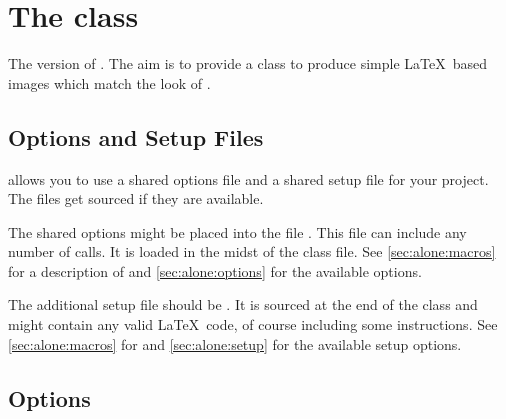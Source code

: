 \chapter{The  class}
The  version of . The aim is to provide a class
to produce simple \LaTeX\ based images which match the look of .

\section{Options and Setup Files}\label{sec:alone:files}%
 allows you to use a shared options file and a shared setup file
for your project. The files get sourced if they are available.

The shared options might be placed into the file .
This file can include any number of  calls. It is loaded in
the midst of the class file. See \autoref{sec:alone:macros} for a description of
 and \autoref{sec:alone:options} for the available options.

The additional setup file should be . It is sourced
at the end of the class and might contain any valid \LaTeX\ code, of course
including some  instructions. See \autoref{sec:alone:macros}
for  and \autoref{sec:alone:setup} for the available setup
options.

\section{Options}%
